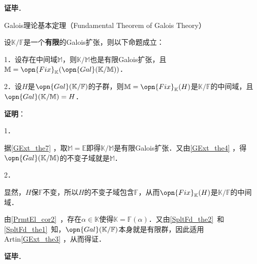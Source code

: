 \textbf{证毕}．











\begin{theorem}{Galois理论基本定理（Fundamental Theorem of Galois Theory）}\label{GExt_the10}

设$\mathbb{K}/\mathbb{F}$是一个\textbf{有限}的Galois扩张，则以下命题成立：

1．设存在中间域$\mathbb{M}$，则$\mathbb{K}/\mathbb{M}$也是有限Galois扩张，且$\mathbb{M}=\opn{Fix}_\mathbb{K}(\opn{Gal}(\mathbb{K}/\mathbb{M}))$．

2．设$H$是$\opn{Gal}(\mathbb{K}/\mathbb{F})$的子群，则$\mathbb{M}=\opn{Fix}_\mathbb{K}(H)$是$\mathbb{K}/\mathbb{F}$的中间域，且$\opn{Gal}(\mathbb{K}/\mathbb{M})=H$．


\end{theorem}

\textbf{证明}：

1．

据\autoref{GExt_the7} ，取$\mathbb{M}=\mathbb{E}$即得$\mathbb{K}/\mathbb{M}$是有限Galois扩张．又由\autoref{GExt_the4} ，得$\opn{Gal}(\mathbb{K}/\mathbb{M})$的不变子域就是$\mathbb{M}$．

2．

显然，$H$保$\mathbb{F}$不变，所以$H$的不变子域包含$\mathbb{F}$，从而$\opn{Fix}_\mathbb{K}(H)$是$\mathbb{K}/\mathbb{F}$的中间域．

由\autoref{PrmtEl_cor2}~，存在$\alpha\in\mathbb{K}$使得$\mathbb{K}=\mathbb{F}(\alpha)$．又由\autoref{SpltFd_the2}~和\autoref{SpltFd_the1}~知，$\opn{Gal}(\mathbb{K}/\mathbb{F})$本身就是有限群，因此适用Artin\autoref{GExt_the3} ，从而得证．

\textbf{证毕}．


















